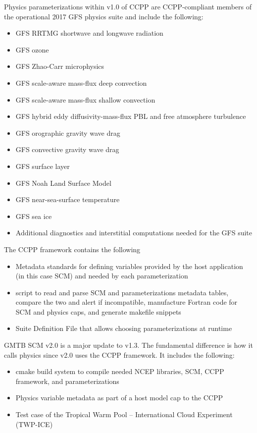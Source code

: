 Physics parameterizations within v1.0 of CCPP are CCPP-compliant members of the operational 2017 GFS physics suite and include the following:
\begin{itemize}
	\item GFS RRTMG shortwave and longwave radiation
	\item GFS ozone
	\item GFS Zhao-Carr microphysics
	\item GFS scale-aware mass-flux deep convection
	\item GFS scale-aware mass-flux shallow convection
	\item GFS hybrid eddy diffusivity-mass-flux PBL and free atmosphere turbulence
	\item GFS orographic gravity wave drag
	\item GFS convective gravity wave drag
	\item GFS surface layer
	\item GFS Noah Land Surface Model
	\item GFS near-sea-surface temperature
	\item GFS sea ice
	\item Additional diagnostics and interstitial computations needed for the GFS suite
\end{itemize}

The CCPP framework contains the following
\begin{itemize}
\item Metadata standards for defining variables provided by the host application (in this case SCM) and needed by each parameterization
\item {} script to read and parse SCM and parameterizations metadata tables, compare the two and alert if incompatible, manufacture Fortran code for SCM and physics caps, and generate makefile snippets
\item Suite Definition File that allows choosing parameterizations at runtime
\end{itemize}

GMTB SCM v2.0 is a major update to v1.3. The fundamental difference is how it calls physics since v2.0 uses the CCPP framework. It includes the following:

\begin{itemize}
\item cmake build system to compile needed NCEP libraries, SCM, CCPP framework, and parameterizations
\item Physics variable metadata as part of a host model cap to the CCPP
\item Test case of the Tropical Warm Pool -- International Cloud Experiment (TWP-ICE)
\end{itemize}

